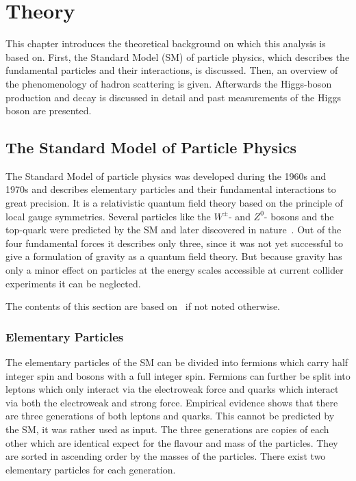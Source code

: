 \chapter{Theory}\label{cha:theory}

This chapter introduces the theoretical background on which this analysis is based on.
First, the Standard Model (SM) of particle physics, which describes the fundamental particles and their interactions, is discussed.
Then, an overview of the phenomenology of hadron scattering is given.
Afterwards the Higgs-boson production and decay is discussed in detail and past measurements of the Higgs boson are presented.

\section{The Standard Model of Particle Physics}\label{sec:theory:sm}

The Standard Model of particle physics was developed during the 1960s and 1970s and
describes elementary particles and their fundamental interactions to great precision.
It is a relativistic quantum field theory based on the principle of local gauge symmetries.
Several particles like the $W^\pm$- and $Z^0$- bosons and the top-quark were predicted by the SM and later discovered in
nature~\cite{ZDiscovery,WDiscovery,TopDiscovery,ZeeDiscovery,WeDiscovery,TopDiscoveryD0}.
Out of the four fundamental forces it describes only three, since it was not yet successful to give a
formulation of gravity as a quantum field theory.
But because gravity has only a minor effect on particles at the energy scales accessible at current collider experiments
it can be neglected.

The contents of this section are based on~\cite{Griffiths,HalsenMartin,PeskinSchroeder} if not noted otherwise.

\subsection{Elementary Particles}\label{sub:theory:sm:particles}

The elementary particles of the SM can be divided into fermions which carry half integer spin and bosons with a full integer spin.
Fermions can further be split into leptons which only interact via the electroweak force and quarks which interact via
both the electroweak and strong force.
Empirical evidence shows that there are three generations of both leptons and quarks.
This cannot be predicted by the SM, it was rather used as input.
The three generations are copies of each other which are identical expect for the flavour and mass of the particles.
They are sorted in ascending order by the masses of the particles.
There exist two elementary particles for each generation.

